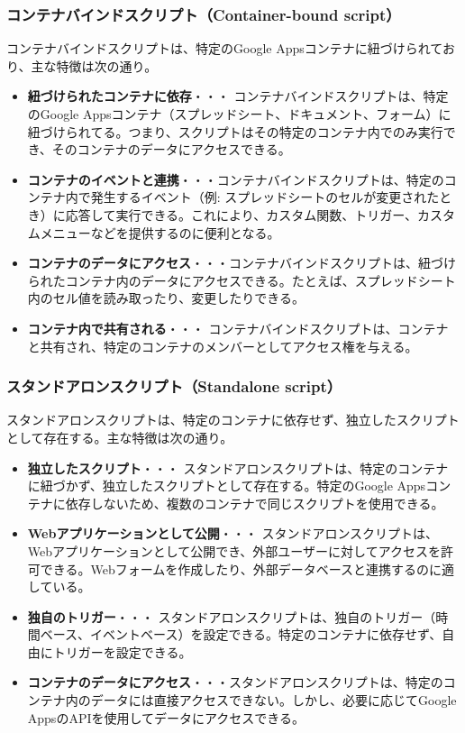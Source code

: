 \documentclass{jsarticle}
\begin{document}
\subsubsection{コンテナバインドスクリプト（Container-bound script）}
コンテナバインドスクリプトは、特定のGoogle Appsコンテナに紐づけられており、主な特徴は次の通り。

\begin{itemize}
    \item {\bf 紐づけられたコンテナに依存}・・・ コンテナバインドスクリプトは、特定のGoogle Appsコンテナ（スプレッドシート、ドキュメント、フォーム）に紐づけられてる。つまり、スクリプトはその特定のコンテナ内でのみ実行でき、そのコンテナのデータにアクセスできる。
    
    \item {\bf コンテナのイベントと連携}・・・コンテナバインドスクリプトは、特定のコンテナ内で発生するイベント（例: スプレッドシートのセルが変更されたとき）に応答して実行できる。これにより、カスタム関数、トリガー、カスタムメニューなどを提供するのに便利となる。
    
    \item {\bf コンテナのデータにアクセス}・・・コンテナバインドスクリプトは、紐づけられたコンテナ内のデータにアクセスできる。たとえば、スプレッドシート内のセル値を読み取ったり、変更したりできる。
    
    \item {\bf コンテナ内で共有される}・・・ コンテナバインドスクリプトは、コンテナと共有され、特定のコンテナのメンバーとしてアクセス権を与える。
\end{itemize}

\subsubsection{スタンドアロンスクリプト（Standalone script）}
スタンドアロンスクリプトは、特定のコンテナに依存せず、独立したスクリプトとして存在する。主な特徴は次の通り。

\begin{itemize}
    \item {\bf 独立したスクリプト}・・・ スタンドアロンスクリプトは、特定のコンテナに紐づかず、独立したスクリプトとして存在する。特定のGoogle Appsコンテナに依存しないため、複数のコンテナで同じスクリプトを使用できる。
    
    \item {\bf Webアプリケーションとして公開}・・・ スタンドアロンスクリプトは、Webアプリケーションとして公開でき、外部ユーザーに対してアクセスを許可できる。Webフォームを作成したり、外部データベースと連携するのに適している。
    
    \item {\bf 独自のトリガー}・・・ スタンドアロンスクリプトは、独自のトリガー（時間ベース、イベントベース）を設定できる。特定のコンテナに依存せず、自由にトリガーを設定できる。
    
    \item {\bf コンテナのデータにアクセス}・・・スタンドアロンスクリプトは、特定のコンテナ内のデータには直接アクセスできない。しかし、必要に応じてGoogle AppsのAPIを使用してデータにアクセスできる。
\end{itemize}
\end{document}
